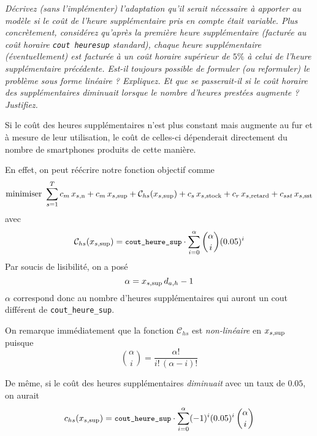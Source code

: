 \question %
\emph{Décrivez (sans l'implémenter) l'adaptation qu'il serait nécessaire à
apporter au modèle si le coût de l'heure supplémentaire pris en compte était
variable. Plus concrètement, considérez qu'après la première heure
supplémentaire (facturée au coût horaire \texttt{cout\textunderscore
heure\textunderscore sup} standard), chaque heure supplémentaire
(éventuellement) est facturée à un coût horaire supérieur de $5 \%$
à celui de l'heure supplémentaire précédente.
Est-il toujours possible de formuler (ou reformuler)
le problème sous forme linéaire ? Expliquez.
Et que se passerait-il si le coût horaire des supplémentaires \emph{diminuait}
lorsque le nombre d'heures prestées augmente ? Justifiez.}

Si le coût des heures supplémentaires n'est plus constant mais augmente au fur et à mesure de leur utilisation,
le coût de celles-ci dépenderait directement du nombre de smartphones
produits de cette manière.

En effet, on peut réécrire notre fonction objectif comme
\[
  \mbox{minimiser }
  \sum_{s=1}^{T}
  c_m\, x_{s,\text{n}} + c_m \, x_{s,\text{sup}} + \mathcal{C}_{hs} (x_{s,\text{sup}})
  + c_s\, x_{s,\text{stock}} + c_r\, x_{s,\text{retard}} + c_{sst}\, x_{s,\text{sst}}
\]
avec
\[
  \mathcal{C}_{hs} (x_{s,\text{sup}}) = {\small\texttt{cout\_heure\_sup}} \cdot
  \sum_{i=0}^{\alpha} \binom{\alpha}{i} (0.05)^{i}
\]
Par soucis de lisibilité, on a posé
\[ \alpha = x_{s,\text{sup}} \, d_{a,h} - 1 \]
$\alpha$ correspond donc au nombre d'heures supplémentaires qui auront
un cout différent de \texttt{cout\_heure\_sup}.

On remarque immédiatement que la fonction $\mathcal{C}_{hs}$
est \emph{non-linéaire} en $x_{s,\text{sup}}$ puisque
\[ \binom{\alpha}{i} =\frac{\alpha !}{i!\,(\alpha-i)!} \]

De même, si le coût des heures supplémentaires \emph{diminuait}
avec un taux de $0.05$,
on aurait
\[
  c_{hs} (x_{s,\text{sup}}) = {\small\texttt{cout\_heure\_sup}} \cdot
  \sum_{i=0}^{\alpha} (-1)^i(0.05)^{i} \,   \binom{\alpha}{i}
\]
